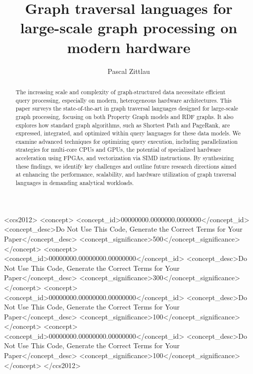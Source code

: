 \documentclass[sigconf,authordraft]{acmart}
\begin{document}
\title{Graph traversal languages for large-scale graph processing on modern hardware}

\author{Pascal Zittlau}

\begin{abstract}
	The increasing scale and complexity of graph-structured data necessitate efficient query processing, especially on modern, heterogeneous hardware architectures.
	This paper surveys the state-of-the-art in graph traversal languages designed for large-scale graph processing, focusing on both Property Graph models and RDF graphs.
	It also explores how standard graph algorithms, such as Shortest Path and PageRank, are expressed, integrated, and optimized within query languages for these data models.
	We examine advanced techniques for optimizing query execution, including parallelization strategies for multi-core CPUs and GPUs, the potential of specialized hardware acceleration using FPGAs, and vectorization via SIMD instructions.
	By synthesizing these findings, we identify key challenges and outline future research directions aimed at enhancing the performance, scalability, and hardware utilization of graph traversal languages in demanding analytical workloads.
\end{abstract}

\begin{CCSXML}
	<ccs2012>
	<concept>
	<concept_id>00000000.0000000.0000000</concept_id>
	<concept_desc>Do Not Use This Code, Generate the Correct Terms for Your Paper</concept_desc>
	<concept_significance>500</concept_significance>
	</concept>
	<concept>
	<concept_id>00000000.00000000.00000000</concept_id>
	<concept_desc>Do Not Use This Code, Generate the Correct Terms for Your Paper</concept_desc>
	<concept_significance>300</concept_significance>
	</concept>
	<concept>
	<concept_id>00000000.00000000.00000000</concept_id>
	<concept_desc>Do Not Use This Code, Generate the Correct Terms for Your Paper</concept_desc>
	<concept_significance>100</concept_significance>
	</concept>
	<concept>
	<concept_id>00000000.00000000.00000000</concept_id>
	<concept_desc>Do Not Use This Code, Generate the Correct Terms for Your Paper</concept_desc>
	<concept_significance>100</concept_significance>
	</concept>
	</ccs2012>
\end{CCSXML}

\end{document}
